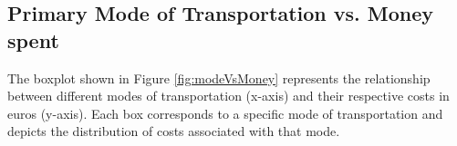 \subsection{Primary Mode of Transportation vs. Money spent}

The boxplot shown in Figure \ref{fig:modeVsMoney} represents the relationship between different modes of transportation (x-axis) and their respective costs in euros (y-axis). Each box corresponds to a specific mode of transportation and depicts the distribution of costs associated with that mode.


